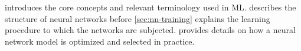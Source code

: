  introduces the core concepts and relevant terminology used in ML.
 describes the structure of neural networks before \cref{sec:nn-training} explains the learning procedure to which the networks are subjected.  provides details on how a neural network model is optimized and selected in practice.








